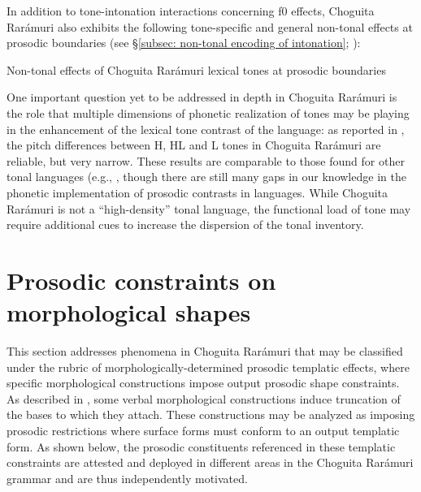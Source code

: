 In addition to tone-intonation interactions concerning f0 effects, Choguita Rarámuri also exhibits the following tone-specific and general non-tonal effects at prosodic boundaries (see §\ref{subsec: non-tonal encoding of intonation}; \citealt{caballero2014tone, aguilar2015multi}):

\ea\label{ex: non-tonal effects of tones at prosodic boundaries}
{Non-tonal effects of Choguita Rarámuri lexical tones at prosodic boundaries}\mbox{}
    \z
\z


One important question yet to be addressed in depth in Choguita Rarámuri is the role that multiple dimensions of phonetic realization of tones may be playing in the enhancement of the lexical tone contrast of the language: as reported in \citet{caballero2015tone}, the pitch differences between H, HL and L tones in Choguita Rarámuri are reliable, but very narrow. These results are comparable to those found for other  tonal languages (e.g.,  \parencite{guion2010word}, though there are still many gaps in our knowledge in the phonetic implementation of prosodic contrasts in  languages. While Choguita Rarámuri is not a ``high-density'' tonal language, the functional load of tone may require additional cues to increase the dispersion of the tonal inventory.


\section{Prosodic constraints on morphological shapes}
\label{sec: prosodic constraints on morphological shapes}

This section addresses phenomena in Choguita Rarámuri that may be classified under the rubric of morphologically-determined prosodic templatic effects, where specific morphological constructions impose output prosodic shape constraints. As described in , some verbal morphological constructions induce truncation of the bases to which they attach.  These constructions may be analyzed as imposing prosodic restrictions where surface forms must conform to an output templatic form. As shown below, the prosodic constituents referenced in these templatic constraints are attested and deployed in different areas in the Choguita Rarámuri grammar and are thus independently motivated.

